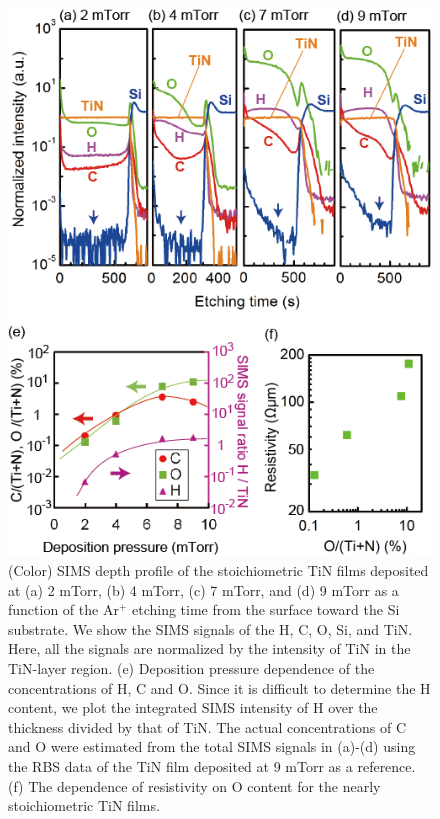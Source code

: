 \begin{figure}
\begin{center}
\includegraphics[width=125mm]{SIMS2-9.jpg}
\end{center}

\caption{(Color) SIMS depth profile of the stoichiometric TiN films deposited at (a) 2 mTorr, (b) 4 mTorr, (c) 7 mTorr, and (d) 9 mTorr as a function of the Ar$^{+}$ etching time from the surface toward the Si substrate. We show the SIMS signals of the H, C, O, Si, and TiN. Here, all the signals are normalized by the intensity of TiN in the TiN-layer region. (e) Deposition pressure dependence of the concentrations of H, C and O. Since it is difficult to determine the H content, we plot the integrated SIMS intensity of H over the thickness divided by that of TiN. The actual concentrations of C and O were estimated from the total SIMS signals in (a)-(d) using the RBS data of the TiN film deposited at 9 mTorr as a reference.  (f)  The dependence of resistivity on O content for the nearly stoichiometric TiN films.}
\label{SIMS2-9}
\end{figure}
